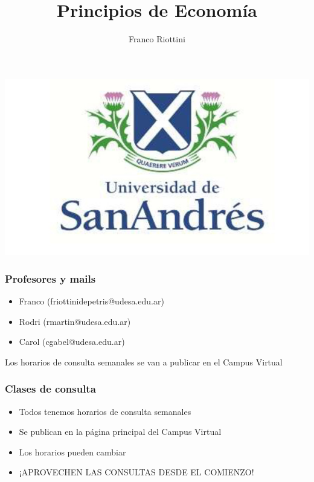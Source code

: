 \documentclass{beamer}
\title[Principios de Economía]{Principios de Economía}
\date{}
\author[Riottini]{Franco Riottini}
\institute[]{Universidad de San Andrés \\
2024}
\begin{document}
\begin{frame}

    \titlepage
    \centering
    \includegraphics[scale=0.25]{../Figures/logoUDESA.jpg} 

\end{frame}

\begin{frame}
\frametitle{Profesores y mails}
\begin{itemize}
    \item Franco (friottinidepetris@udesa.edu.ar)
    \item Rodri (rmartin@udesa.edu.ar)
    \item Carol (cgabel@udesa.edu.ar)
\end{itemize}
Los horarios de consulta semanales se van a publicar en el Campus Virtual
\end{frame}

\begin{frame}
    \frametitle{Clases de consulta}
    \begin{itemize}
        \item Todos tenemos horarios de consulta semanales \vspace{2mm}
        \item Se publican en la página principal del Campus Virtual \vspace{2mm}
        \item Los horarios pueden cambiar \vspace{2mm}
        \item ¡APROVECHEN LAS CONSULTAS DESDE EL COMIENZO!
    \end{itemize}
\end{frame}
\end{document}
